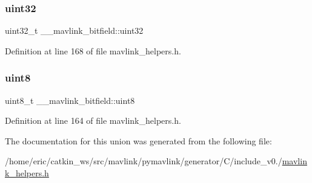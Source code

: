 \subsubsection{\texorpdfstring{uint32}{uint32}}
{\footnotesize\ttfamily uint32\+\_\+t \+\_\+\+\_\+mavlink\+\_\+bitfield\+::uint32}



Definition at line 168 of file mavlink\+\_\+helpers.\+h.

\mbox{\label{union____mavlink__bitfield_ade669a5f63c53f0d61f636eff94417c0}} 
\subsubsection{\texorpdfstring{uint8}{uint8}}
{\footnotesize\ttfamily uint8\+\_\+t \+\_\+\+\_\+mavlink\+\_\+bitfield\+::uint8}



Definition at line 164 of file mavlink\+\_\+helpers.\+h.



The documentation for this union was generated from the following file\+:\begin{DoxyCompactItemize}
\item 
/home/eric/catkin\+\_\+ws/src/mavlink/pymavlink/generator/\+C/include\+\_\+v0./\mbox{\hyperlink{include__v0_89_2mavlink__helpers_8h}{mavlink\+\_\+helpers.\+h}}\end{DoxyCompactItemize}
